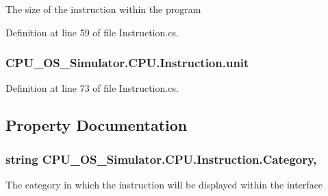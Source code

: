 The size of the instruction within the program 



Definition at line 59 of file Instruction.\+cs.

\hypertarget{class_c_p_u___o_s___simulator_1_1_c_p_u_1_1_instruction_a0337c93fbfb5993eab37f1d052ca5f43}{}
\subsubsection[{unit}]{ C\+P\+U\+\_\+\+O\+S\+\_\+\+Simulator.\+C\+P\+U.\+Instruction.\+unit\hspace{0.3cm}{\ttfamily [private]}}\label{class_c_p_u___o_s___simulator_1_1_c_p_u_1_1_instruction_a0337c93fbfb5993eab37f1d052ca5f43}


Definition at line 73 of file Instruction.\+cs.



\subsection{Property Documentation}
\hypertarget{class_c_p_u___o_s___simulator_1_1_c_p_u_1_1_instruction_a7b7c3068cebbf81c64b67496b20c733a}{}
\subsubsection[{Category}]{\setlength{\rightskip}{0pt plus 5cm}string C\+P\+U\+\_\+\+O\+S\+\_\+\+Simulator.\+C\+P\+U.\+Instruction.\+Category\hspace{0.3cm}{\ttfamily [get]}, {\ttfamily [set]}}\label{class_c_p_u___o_s___simulator_1_1_c_p_u_1_1_instruction_a7b7c3068cebbf81c64b67496b20c733a}


The category in which the instruction will be displayed within the interface 



